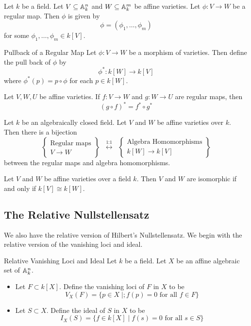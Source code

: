 \documentclass[a4paper]{article}
\begin{document}
\begin{prp}{}{} Let $k$ be a field. Let $V\subseteq\mathbb{A}_k^n$ and $W\subseteq\mathbb{A}_k^m$ be affine varieties. Let $\phi:V\to W$ be a regular map. Then $\phi$ is given by $$\phi=(\phi_1,\dots,\phi_m)$$ for some $\phi_1,\dots,\phi_m\in k[V]$. 
\end{prp}

\begin{defn}{Pullback of a Regular Map}{} Let $\phi:V\to W$ be a morphism of varieties. Then define the pull back of $\phi$ by $$\phi^\ast:k[W]\to k[V]$$ where $\phi^\ast(p)=p\circ\phi$ for each $p\in k[W]$. 
\end{defn}

\begin{lmm}{}{} Let $V,W,U$ be affine varieties. If $f:V\to W$ and $g:W\to U$ are regular maps, then $$(g\circ f)^\ast=f^\ast\circ g^\ast$$
\end{lmm}

\begin{prp}{}{} Let $k$ be an algebraically closed field. Let $V$ and $W$ be affine varieties over $k$. Then there is a bijection $$\left\{\substack{\text{Regular maps}\\ V\to W}\right\}\;\;\overset{\text{1:1}}{\longleftrightarrow}\;\;\left\{\substack{\text{Algebra Homomorphisms}\\ k[W]\to k[V]}\right\}$$ between the regular maps and algebra homomorphisms. 
\end{prp}

\begin{crl}{}{} Let $V$ and $W$ be affine varieties over a field $k$. Then $V$ and $W$ are isomorphic if and only if $k[V]\cong k[W]$. 
\end{crl}

\subsection{The Relative Nullstellensatz}
We also have the relative version of Hilbert's Nullstellensatz. We begin with the relative version of the vanishing loci and ideal. 

\begin{defn}{Relative Vanishing Loci and Ideal}{} Let $k$ be a field. Let $X$ be an affine algebraic set of $\mathbb{A}_k^n$. 
\begin{itemize}
\item Let $F\subset k[X]$. Define the vanishing loci of $F$ in $X$ to be $$V_X(F)=\{p\in X\;|;f(p)=0\text{ for all }f\in F\}$$
\item Let $S\subset X$. Define the ideal of $S$ in $X$ to be $$I_X(S)=\{f\in k[X]\;|\;f(s)=0\text{ for all }s\in S\}$$
\end{itemize}
\end{defn}
\end{document}
